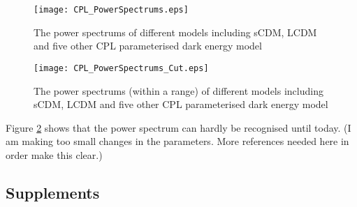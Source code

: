 \documentclass{article}
\begin{document}
\begin{figure}[!htbp]
\centering
\texttt{[image: CPL\_PowerSpectrums.eps]}
\caption{The power spectrums of different models including sCDM, LCDM and five other CPL parameterised dark energy model}\label{fig:CPL_PowerSpectrums}
\end{figure}





\begin{figure}[!htbp]
\centering
\texttt{[image: CPL\_PowerSpectrums\_Cut.eps]}
\caption{The power spectrums (within a range) of different models including sCDM, LCDM and five other CPL parameterised dark energy model}\label{fig:CPL_PowerSpectrums_Cut}
\end{figure}





Figure \ref{fig:CPL_PowerSpectrums_Cut} shows that the power spectrum can hardly be recognised until today. (I am making too small changes in the parameters. More references needed here in order make this clear.)












\subsection{\color{blue}Supplements}
\end{document}
